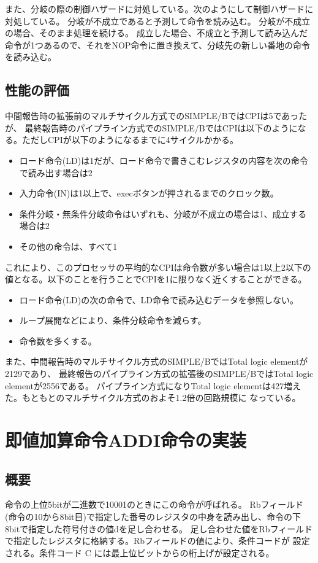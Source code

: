 \documentclass[a4j,titlepage]{jarticle}
\begin{document}
また、分岐の際の制御ハザードに対処している。次のようにして制御ハザードに対処している。
分岐が不成立であると予測して命令を読み込む。
分岐が不成立の場合、そのまま処理を続ける。
成立した場合、不成立と予測して読み込んだ命令が1つあるので、それをNOP命令に置き換えて、分岐先の新しい番地の命令を読み込む。

\subsection{性能の評価}
中間報告時の拡張前のマルチサイクル方式でのSIMPLE/BではCPIは5であったが、
最終報告時のパイプライン方式でのSIMPLE/BではCPIは以下のようになる。ただしCPIが以下のようになるまでに4サイクルかかる。
\begin{itemize}
    \item ロード命令(LD)は1だが、ロード命令で書きこむレジスタの内容を次の命令で読み出す場合は2
    \item 入力命令(IN)は1以上で、execボタンが押されるまでのクロック数。
    \item 条件分岐・無条件分岐命令はいずれも、分岐が不成立の場合は1、成立する場合は2
    \item その他の命令は、すべて1
\end{itemize}
これにより、このプロセッサの平均的なCPIは命令数が多い場合は1以上2以下の値となる。以下のことを行うことでCPIを1に限りなく近くすることができる。
\begin{itemize}
    \item ロード命令(LD)の次の命令で、LD命令で読み込むデータを参照しない。
    \item ループ展開などにより、条件分岐命令を減らす。
    \item 命令数を多くする。
\end{itemize}

また、中間報告時のマルチサイクル方式のSIMPLE/BではTotal logic elementが2129であり、
最終報告のパイプライン方式の拡張後のSIMPLE/BではTotal logic elementが2556である。
パイプライン方式になりTotal logic elementは427増えた。もともとのマルチサイクル方式のおよそ1.2倍の回路規模に
なっている。


\section{即値加算命令ADDI命令の実装}
\subsection{概要}
命令の上位5bitが二進数で10001のときにこの命令が呼ばれる。
Rbフィールド(命令の10から8bit目)で指定した番号のレジスタの中身を読み出し、命令の下8bitで指定した符号付きの値dを足し合わせる。
足し合わせた値をRbフィールドで指定したレジスタに格納する。Rbフィールドの値により、条件コードが
設定される。条件コード C には最上位ビットからの桁上げが設定される。
\end{document}

